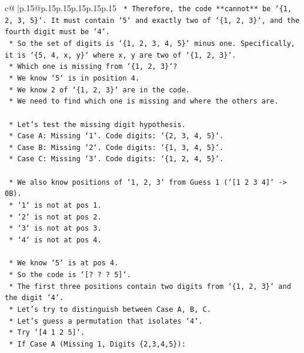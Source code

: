 \documentclass{article}
\begin{document}
{\begin{supertabular}{c@{$\;$}|p{.15\linewidth}@{}p{.15\linewidth}p{.15\linewidth}p{.15\linewidth}p{.15\linewidth}p{.15\linewidth}}
{{{\texttt{        *   Therefore, the code **cannot** be `\{1, 2, 3, 5\}`. It must contain `5` and exactly two of `\{1, 2, 3\}`, and the fourth digit must be `4`.} \\
\texttt{        *   So the set of digits is `\{1, 2, 3, 4, 5\}` minus one. Specifically, it is `\{5, 4, x, y\}` where x, y are two of `\{1, 2, 3\}`.} \\
\texttt{        *   Which one is missing from `\{1, 2, 3\}`?} \\
\texttt{            *   We know `5` is in position 4.} \\
\texttt{            *   We know 2 of `\{1, 2, 3\}` are in the code.} \\
\texttt{            *   We need to find which one is missing and where the others are.} \\
\\ 
\texttt{    *   Let's test the missing digit hypothesis.} \\
\texttt{        *   Case A: Missing `1`. Code digits: `\{2, 3, 4, 5\}`.} \\
\texttt{        *   Case B: Missing `2`. Code digits: `\{1, 3, 4, 5\}`.} \\
\texttt{        *   Case C: Missing `3`. Code digits: `\{1, 2, 4, 5\}`.} \\
\\ 
\texttt{    *   We also know positions of `1, 2, 3` from Guess 1 (`{[}1 2 3 4{]}` {-}> 0B).} \\
\texttt{        *   `1` is not at pos 1.} \\
\texttt{        *   `2` is not at pos 2.} \\
\texttt{        *   `3` is not at pos 3.} \\
\texttt{        *   `4` is not at pos 4.} \\
\\ 
\texttt{    *   We know `5` is at pos 4.} \\
\texttt{    *   So the code is `{[}? ? ? 5{]}`.} \\
\texttt{    *   The first three positions contain two digits from `\{1, 2, 3\}` and the digit `4`.} \\
\texttt{    *   Let's try to distinguish between Case A, B, C.} \\
\texttt{    *   Let's guess a permutation that isolates `4`.} \\
\texttt{    *   Try `{[}4 1 2 5{]}`.} \\
\texttt{        *   If Case A (Missing 1, Digits \{2,3,4,5\}):} \\
}}}
\end{supertabular}}
\end{document}
